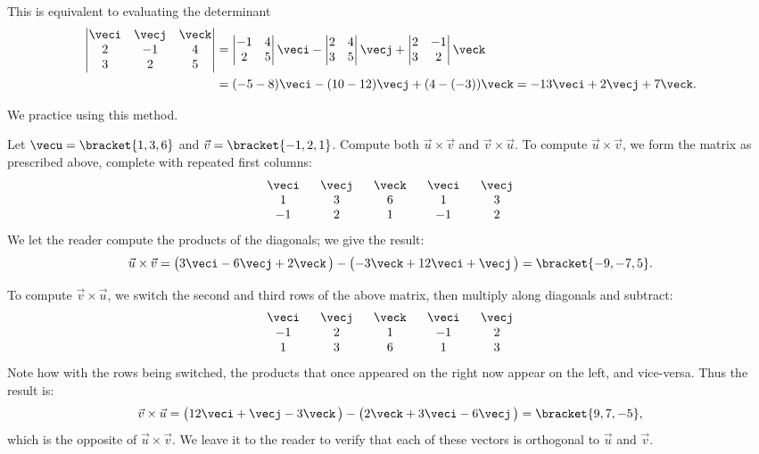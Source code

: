 This is equivalent to evaluating the determinant
\begin{align*}
 \begin{vmatrix}\veci&\vecj&\veck\\2&-1&4\\3&2&5\end{vmatrix}
 &=\begin{vmatrix}-1&4\\2&5\end{vmatrix}\veci
 -\begin{vmatrix}2&4\\3&5\end{vmatrix}\vecj
 +\begin{vmatrix}2&-1\\3&2\end{vmatrix}\veck \\
 &=(-5-8)\veci-(10-12)\vecj+(4-(-3))\veck
 =-13\veci+2\vecj+7\veck.
\end{align*}

We practice using this method.

\begin{example}\label{ex_crossp2}%
Let $\vecu=\bracket{1,3,6}$ and $\vec v = \bracket{-1,2,1}$. Compute both $\vec u\times\vec v$ and $\vec v\times\vec u$.
\solution
To compute $\vec u\times\vec v$, we form the matrix as prescribed above, complete with repeated first columns:
\[\begin{array}{ c c c c c } \ \veci\ &\ \vecj\ &\ \veck\ &\ \veci\ &\ \vecj\ \\  1&3&6&1&3\\ -1&2&1&-1&2\end{array}\]
We let the reader compute the products of the diagonals; we give the result:
\[\vec u\times\vec v = \bigl(3\veci-6\vecj+2\veck\,\bigr) - \bigl(-3\veck + 12\veci+\vecj\,\bigr) = \bracket{-9,-7,5}.\]

To compute $\vec v\times\vec u$, we switch the second and third rows of the above matrix, then multiply along diagonals and subtract:
%
\[\begin{array}{ c c c c c } \ \veci\ &\ \vecj\ &\ \veck\ &\ \veci\ &\ \vecj\ \\ -1&2&1&-1&2\\  1&3&6&1&3\end{array}\]
Note how with the rows being switched, the products that once appeared on the right now appear on the left, and vice-versa. Thus the result is:
\[\vec v\times\vec u = \bigl(12\veci+\vecj-3\veck\,\bigr) - \bigl(2\veck + 3\veci-6\vecj\,\bigr) = \bracket{9,7,-5},\]
which is the opposite of $\vec u\times\vec v$. We leave it to the reader to verify that each of these vectors is orthogonal to $\vec u$ and $\vec v$.
\end{example}

